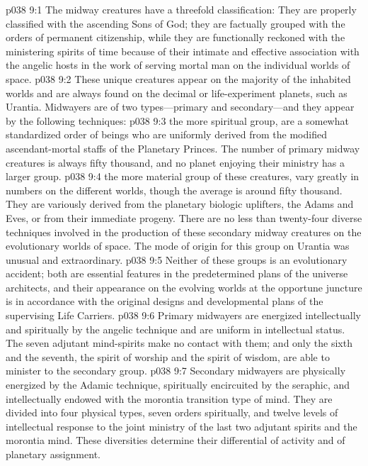 \vs p038 9:1 The midway creatures have a threefold classification: They are properly classified with the ascending Sons of God; they are factually grouped with the orders of permanent citizenship, while they are functionally reckoned with the ministering spirits of time because of their intimate and effective association with the angelic hosts in the work of serving mortal man on the individual worlds of space.
\vs p038 9:2 These unique creatures appear on the majority of the inhabited worlds and are always found on the decimal or life\hyp{}experiment planets, such as Urantia. Midwayers are of two types---primary and secondary---and they appear by the following techniques:
\pc \vs p038 9:3 \bibnobreakspace {} the more spiritual group, are a somewhat standardized order of beings who are uniformly derived from the modified ascendant\hyp{}mortal staffs of the Planetary Princes. The number of primary midway creatures is always fifty thousand, and no planet enjoying their ministry has a larger group.
\pc \vs p038 9:4 \bibnobreakspace {} the more material group of these creatures, vary greatly in numbers on the different worlds, though the average is around fifty thousand. They are variously derived from the planetary biologic uplifters, the Adams and Eves, or from their immediate progeny. There are no less than twenty\hyp{}four diverse techniques involved in the production of these secondary midway creatures on the evolutionary worlds of space. The mode of origin for this group on Urantia was unusual and extraordinary.
\pc \vs p038 9:5 Neither of these groups is an evolutionary accident; both are essential features in the predetermined plans of the universe architects, and their appearance on the evolving worlds at the opportune juncture is in accordance with the original designs and developmental plans of the supervising Life Carriers.
\vs p038 9:6 Primary midwayers are energized intellectually and spiritually by the angelic technique and are uniform in intellectual status. The seven adjutant mind\hyp{}spirits make no contact with them; and only the sixth and the seventh, the spirit of worship and the spirit of wisdom, are able to minister to the secondary group.
\vs p038 9:7 Secondary midwayers are physically energized by the Adamic technique, spiritually encircuited by the seraphic, and intellectually endowed with the morontia transition type of mind. They are divided into four physical types, seven orders spiritually, and twelve levels of intellectual response to the joint ministry of the last two adjutant spirits and the morontia mind. These diversities determine their differential of activity and of planetary assignment.
